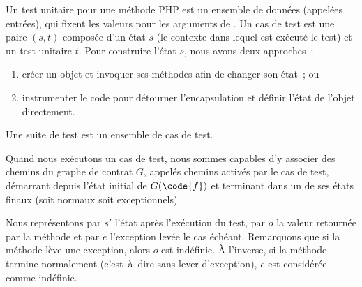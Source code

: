 \begin{definition}

Un {\strong test unitaire} pour une méthode PHP  est un ensemble de
données (appelées entrées), qui fixent les valeurs pour les
arguments de . Un {\strong cas de test} est une paire $(s, t)$ composée
d'un état $s$ (le contexte dans lequel est exécuté le test) et un test unitaire
$t$. Pour construire l'état $s$, nous avons deux approches~:
%
\begin{enumerate}

\item créer un objet et invoquer ses méthodes afin de changer son état~; ou

\item instrumenter le code pour détourner l'encapsulation et définir l'état de
l'objet directement.

\end{enumerate}
%
Une {\strong suite de test} est un ensemble de cas de test.

\end{definition}

Quand nous exécutons un cas de test, nous sommes capables d'y associer des
chemins du graphe de contrat $G$, appelés chemins {\strong activés par} le cas
de test, démarrant depuis l'état initial de $G(\code{f})$ et terminant dans un
de ses états finaux (soit normaux soit exceptionnels).

Nous représentons par $s'$ l'état après l'exécution du test, par $o$ la valeur
retournée par la méthode  et par $e$ l'exception levée le cas échéant.
Remarquons que si la méthode lève une exception, alors $o$ est indéfinie. À
l'inverse, si la méthode termine normalement (c'est~à~dire sans lever
d'exception), $e$ est considérée comme indéfinie.

